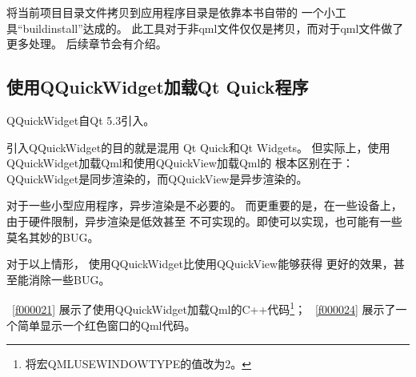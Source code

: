 将当前项目目录文件拷贝到应用程序目录是依靠本书自带的
一个小工具“build\underline{\hspace{0.5em}}install”达成的。
此工具对于非qml文件仅仅是拷贝，而对于qml文件做了更多处理。
后续章节会有介绍。

\FloatBarrier
\subsection{
使用QQuickWidget加载Qt Quick程序
}\label{ss001110}


QQuickWidget自Qt 5.3引入。

引入QQuickWidget的目的就是混用
Qt Quick和Qt Widgets。
但实际上，使用QQuickWidget加载Qml和使用QQuickView加载Qml的
根本区别在于：
QQuickWidget是同步渲染的，而QQuickView是异步渲染的。

对于一些小型应用程序，异步渲染是不必要的。
而更重要的是，在一些设备上，由于硬件限制，异步渲染是低效甚至
不可实现的。即使可以实现，也可能有一些莫名其妙的BUG。

对于以上情形，
使用QQuickWidget比使用QQuickView能够获得
更好的效果，甚至能消除一些BUG。

\lstlistingname\ \ref{f000021}
展示了使用QQuickWidget加载Qml的C{\sourcefonttwo{}+}{\sourcefonttwo{}+}代码\footnote{
将宏QML\underline{\hspace{0.5em}}USE\underline{\hspace{0.5em}}WINDOW\underline{\hspace{0.5em}}TYPE的值改为2。
}；
\lstlistingname\ \ref{f000024}
展示了一个简单显示一个红色窗口的Qml代码。

